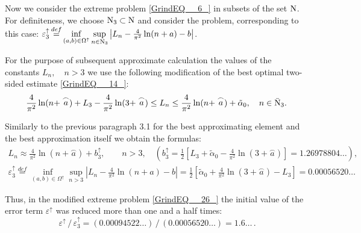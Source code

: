 \documentclass[
11pt,%
tightenlines,%
twoside,%
onecolumn,%
nofloats,%
nobibnotes,%
nofootinbib,%
superscriptaddress,%
noshowpacs,%
centertags]%
{revtex4}
\begin{document}
Now we consider the extreme problem \eqref{GrindEQ__6_} in subsets of the set ${\rm N} $. For definiteness, we choose ${\rm N} _{3} \subset {\rm N} $ and consider the problem, corresponding to this case:  $ \varepsilon _{3}^{\uparrow }  \mathop{=}\limits^{def}  \mathop{\inf }\limits_{(a,  b)  \in  \Omega ^{\uparrow }  }   \mathop{\sup  }\limits_{n\in {\rm N} _{3} } \left| L_{n} -  \frac{4}{\pi ^{2} } \ln (n+a)   -  b \right|  $.

For the purpose of subsequent approximate calculation the values of the constants $L_{n},\quad n>3$ we use the following modification of the best optimal two-sided estimate \eqref{GrindEQ__14_}:
$$
\frac{4}{\pi ^{2} } \ln (n+  \stackrel{\frown}{a} )  +  L_{3}  -  \frac{4}{\pi ^{2} } \ln (3+ \stackrel{\frown}{a} )   \le   L_{n}   \le   \frac{4}{\pi ^{2} } \ln (n+  \stackrel{\frown}{a} )   +  \tilde{\alpha }_{0}  ,    \quad        n\in \bar{{\rm N} }_{3} .
$$

Similarly to the previous paragraph 3.1 for the best approximating element and the best approximation itself we obtain the formulas:
\begin{multline}\label{GrindEQ__26_}
L_{n}   \approx   \frac{4}{\pi ^{2} } \ln (n  +  \stackrel{\frown}{a})  +  b_{3}^{\uparrow }, \qquad n>3,\quad     \left(b_{3}^{\uparrow } =  \frac{1}{2}  [L_{3}  +  \tilde{\alpha }_{0}   -  \frac{4}{\pi ^{2} } \ln (3+\stackrel{\frown}{a})]  = 1.26978804\dots\right),\\
\varepsilon _{3}^{\uparrow } \mathop{ =}\limits^{def}  \mathop{\inf }\limits_{(a,  b)\in \Omega ^{\uparrow }  }   \mathop{\sup }\limits_{n > 3} \left|L_{n} -  \frac{4}{\pi ^{2} } \ln (n+a)  -  b\right|  =
\frac{1}{2} [ \tilde{\alpha }_{0}  +  \frac{4}{\pi ^{2} } \ln (3+ \stackrel{\frown}{a})  -  L_{3}  ]  =0.00056520\dots
\end{multline}

Thus, in the modified extreme problem \eqref{GrindEQ__26_} the initial value of the error term $\varepsilon ^{\uparrow } $ was reduced more than one and a half times:
$$\, \varepsilon ^{\uparrow } \, /\, \varepsilon _{3}^{\uparrow } = ( 0.00094522\dots)\, /\, (0.00056520 \dots )= 1.6\dots  \, .
$$
\end{document}
